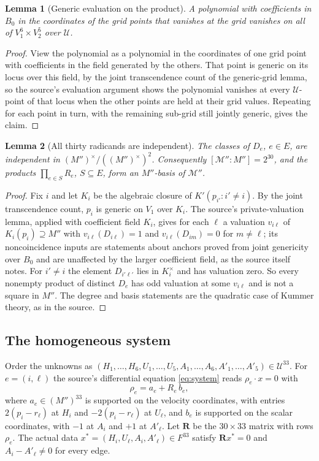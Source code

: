 \documentclass[11pt]{article}
\newtheorem{lemma}{Lemma}
\theoremstyle{remark}
\begin{document}
\begin{lemma}[Generic evaluation on the product]
\label{lem:product}
A polynomial with coefficients in $B_0$ in the coordinates of the
grid points that vanishes at the grid vanishes on all of
$V_1^6\times V_2^5$ over $\mathcal U$.
\end{lemma}
\begin{proof}
View the polynomial as a polynomial in the coordinates of one grid
point with coefficients in the field generated by the others. That
point is generic on its locus over this field, by the joint
transcendence count of the generic-grid lemma, so the source's
evaluation argument shows the polynomial vanishes at every
$\mathcal U$-point of that locus when the other points are held at
their grid values. Repeating for each point in turn, with the
remaining sub-grid still jointly generic, gives the claim.
\end{proof}

\begin{lemma}[All thirty radicands are independent]
\label{lem:thirty}
The classes of $D_e$, $e\in E$, are independent in
$(M'')^\times/((M'')^\times)^2$. Consequently
$[\mathcal M'':M'']=2^{30}$, and the products
$\prod_{e\in S}R_e$, $S\subseteq E$, form an $M''$-basis of
$\mathcal M''$.
\end{lemma}
\begin{proof}
Fix $i$ and let $K_i$ be the algebraic closure of
$K'(p_{i'}:i'\ne i)$. By the joint transcendence count, $p_i$ is
generic on $V_1$ over $K_i$. The source's private-valuation lemma,
applied with coefficient field $K_i$, gives for each $\ell$ a
valuation $v_{i\ell}$ of $K_i(p_i)\supseteq M''$ with
$v_{i\ell}(D_{i\ell})=1$ and $v_{i\ell}(D_{im})=0$ for $m\ne\ell$;
its noncoincidence inputs are statements about anchors proved from
joint genericity over $B_0$ and are unaffected by the larger
coefficient field, as the source itself notes. For $i'\ne i$ the
element $D_{i'\ell'}$ lies in $K_i^\times$ and has valuation zero. So
every nonempty product of distinct $D_e$ has odd valuation at some
$v_{i\ell}$ and is not a square in $M''$. The degree and basis
statements are the quadratic case of Kummer theory, as in the source.
\end{proof}

\subsection{The homogeneous system}
Order the unknowns as
$(H_1,\ldots,H_6,U_1,\ldots,U_5,A_1,\ldots,A_6,A'_1,\ldots,A'_5)
\in\mathcal U^{33}$. For $e=(i,\ell)$ the source's differential
equation \eqref{eq:system} reads $\rho_e\cdot x=0$ with
\[
 \rho_e=a_e+R_e\,b_e ,
\]
where $a_e\in(M'')^{33}$ is supported on the velocity coordinates,
with entries $2(p_i-r_\ell)$ at $H_i$ and $-2(p_i-r_\ell)$ at
$U_\ell$, and $b_e$ is supported on the scalar coordinates, with
$-1$ at $A_i$ and $+1$ at $A'_\ell$. Let $\mathbf R$ be the
$30\times33$ matrix with rows $\rho_e$. The actual data
$x^*=(H_i,U_\ell,A_i,A'_\ell)\in F^{33}$ satisfy
$\mathbf Rx^*=0$ and $A_i-A'_\ell\ne0$ for every edge.
\end{document}

